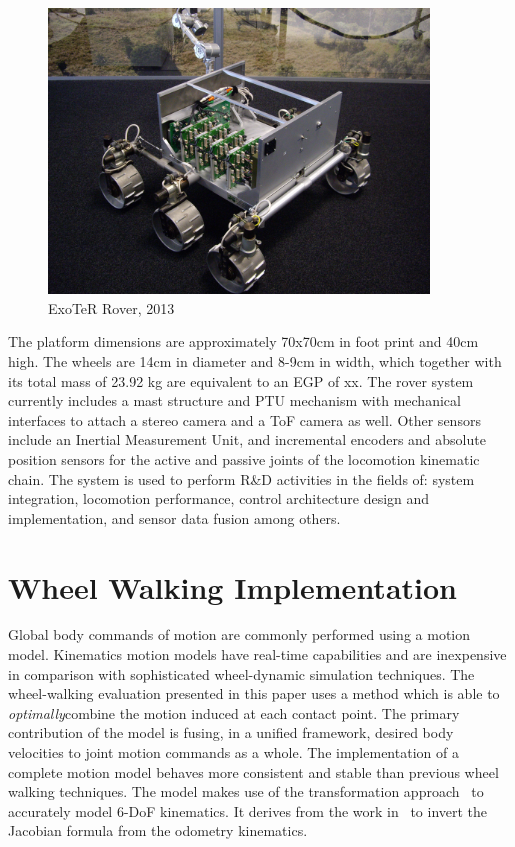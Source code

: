 \documentclass[a4paper,twocolumn]{esapub2005} %
\begin{document}
\begin{figure}[h!]
	\centering		\includegraphics[width=0.9\textwidth]{ExoterRover2013.JPG}	
	\caption{ExoTeR Rover, 2013}
	\label{fig:volley}
\end{figure}

The platform dimensions are approximately 70x70cm in foot print and 40cm high. The wheels are 14cm in diameter and 8-9cm in width, which together with its total mass of 23.92 kg are equivalent to an EGP of xx.
The rover system currently includes a mast structure and PTU mechanism with mechanical interfaces to attach a stereo camera and a ToF camera as well. Other sensors include an Inertial Measurement Unit, and incremental encoders and absolute position sensors for the active and passive joints of the locomotion kinematic chain.
The system is used to perform R\&D activities in the fields of: system integration, locomotion performance, control architecture design and implementation, and sensor data fusion among others. 

\section{Wheel Walking Implementation}

Global body commands of motion are commonly performed using a motion model.
Kinematics motion models have real-time capabilities and are inexpensive in
comparison with sophisticated wheel-dynamic simulation techniques.  The
wheel-walking evaluation presented in this paper uses a method which is able to
\textit{optimally}\footnotemark[2] combine the motion induced at each contact
point. The primary contribution of the model is fusing, in a unified framework,
desired body velocities to joint motion commands as a whole.  The
implementation of a complete motion model behaves more consistent and stable
than previous wheel walking techniques. The model makes use of the
transformation approach~\cite{Tarokh2005} to accurately model 6-DoF kinematics.
It derives from the work in~\cite{Hidalgo-Carrio2014} to invert the Jacobian
formula from the odometry kinematics.
\end{document}
